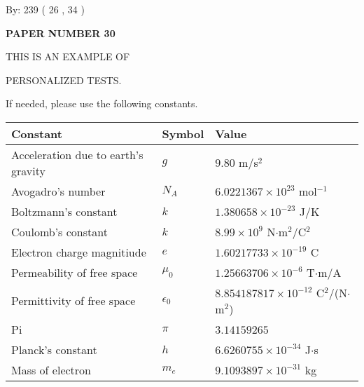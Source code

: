\documentclass[12pt]{article}
\begin{document}
   
\hspace{1.0in} By: 
         239 (          26 ,           34 )
   
   
   
   
\newpage 
\setcounter{page}{ 
    30001 } 
   
   
   
   
 {\textbf{ \Large{ PAPER NUMBER           30  }}}
   
   
\vspace{0.2in}
   
   
   
   
   
   
   
   
 \vspace{0.2in}
 
 
{\Huge  THIS IS AN EXAMPLE OF}
 
{\Huge  PERSONALIZED TESTS. }
 
If needed, please use the following constants.
 
 
 
\noindent\begin{tabular}{|l|l|l|}
\hline
Constant & Symbol & Value \\
\hline
Acceleration due to earth's gravity &
$g$ &
 $ 9.80 $
m/s$^2$ \\
\hline
Avogadro's number &
$N_A$ &
 $ 6.0221367 \times 10^{23} $
mol$^{-1}$ \\
\hline
Boltzmann's constant &
$k$ &
 $ 1.380658 \times 10^{-23} $
J/K \\
\hline
Coulomb's constant &
$k$ &
 $ 8.99 \times 10^{9} $
N$\cdot $m$^2$/C$^2$ \\
\hline
Electron charge magnitiude &
$e$ &
 $ 1.60217733 \times 10^{-19} $
C \\
\hline
Permeability of free space &
$\mu _0$ &
 $ 1.25663706 \times 10^{-6} $
T$\cdot $m/A \\
\hline
Permittivity of free space &
$\epsilon _0$ &
 $ 8.854187817 \times 10^{-12} $
C$^2$/(N$\cdot $m$^2$) \\
\hline
Pi &
$\pi$ &
 $ 3.14159265 $
$ $ \\
\hline
Planck's constant &
$h$ &
 $ 6.6260755 \times 10^{-34} $
J$\cdot $s \\
\hline
Mass of electron &
$m_e$ &
 $ 9.1093897 \times 10^{-31} $
kg \\
\hline
\end{tabular}
 
\end{document}
